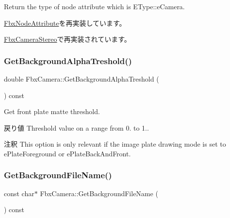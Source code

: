 Return the type of node attribute which is E\+Type\+::e\+Camera. 



\hyperlink{class_fbx_node_attribute_a1c2116756906127145a2b8721fc26752}{Fbx\+Node\+Attribute}を再実装しています。



\hyperlink{class_fbx_camera_stereo_a19160f0fdeaf5407d2bc9c1608f6af53}{Fbx\+Camera\+Stereo}で再実装されています。

\mbox{\label{class_fbx_camera_ad8dd3ac058eae9dab18e43896fbda3ad}} 
\subsubsection{\texorpdfstring{Get\+Background\+Alpha\+Treshold()}{GetBackgroundAlphaTreshold()}}
{\footnotesize\ttfamily double Fbx\+Camera\+::\+Get\+Background\+Alpha\+Treshold (\begin{DoxyParamCaption}{ }\end{DoxyParamCaption}) const}

Get front plate matte threshold. \begin{DoxyReturn}{戻り値}
Threshold value on a range from 0. to 1.. 
\end{DoxyReturn}
\begin{DoxyRemark}{注釈}
This option is only relevant if the image plate drawing mode is set to e\+Plate\+Foreground or e\+Plate\+Back\+And\+Front. 
\end{DoxyRemark}
\mbox{\label{class_fbx_camera_a1de8f9aa601c8a2e12c501da3a419bc8}} 
\subsubsection{\texorpdfstring{Get\+Background\+File\+Name()}{GetBackgroundFileName()}}
{\footnotesize\ttfamily const char$\ast$ Fbx\+Camera\+::\+Get\+Background\+File\+Name (\begin{DoxyParamCaption}{ }\end{DoxyParamCaption}) const}

